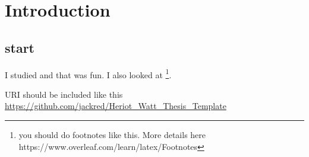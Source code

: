 \documentclass[../Thesis]{subfiles}
\begin{document}
\chapter{Introduction}

\section{start}

I studied \autocite{PSO2007} and that was fun. I also looked at \autocite{SPSO2011} \footnote{you should do footnotes like this. More details here https://www.overleaf.com/learn/latex/Footnotes}.

URI should be included like this \url{https://github.com/jackred/Heriot_Watt_Thesis_Template}
\end{document}

